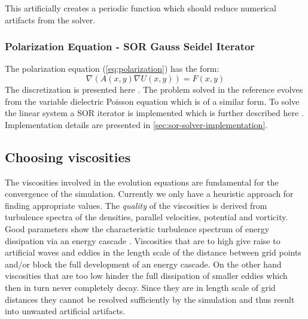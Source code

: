 \documentclass[master.tex]{subfiles}
\begin{document}
This artificially creates a periodic function which should reduce numerical artifacts from the solver.

\subsubsection{Polarization Equation - \ac{SOR} Gauss Seidel Iterator} \label{sec:polarization-equation}
The polarization equation (\autoref{eq:polarization}) has the form:
\begin{equation}
    \nabla\left( A(x, y) \nabla U(x, y)\right) = F(x, y)
\end{equation}
The discretization is presented here \cite{DielectricPoisson}. The problem solved in the reference evolves from the variable dielectric Poisson equation which is of a similar form. To solve the linear system a \ac{SOR} iterator is implemented which is further described here \cite{SORPaper}. Implementation details are presented in \autoref{sec:sor-solver-implementation}.

\subsection{Choosing viscosities}
The viscosities involved in the evolution equations are fundamental for the convergence of the simulation. Currently we only have a heuristic approach for finding appropriate values.\newline
The \textit{quality} of the viscosities is derived from turbulence spectra of the densities, parallel velocities, potential and vorticity. Good parameters show the characteristic turbulence spectrum of energy dissipation via an energy cascade \cite{TurbulentSpectra}.\newline
Viscosities that are to high give raise to artificial waves and eddies in the length scale of the distance between grid points and/or block the full development of an energy cascade. On the other hand viscosities that are too low hinder the full dissipation of smaller eddies which then in turn never completely decay. Since they are in length scale of grid distances they cannot be resolved sufficiently by the simulation and thus result into unwanted artificial artifacts.
\end{document}

